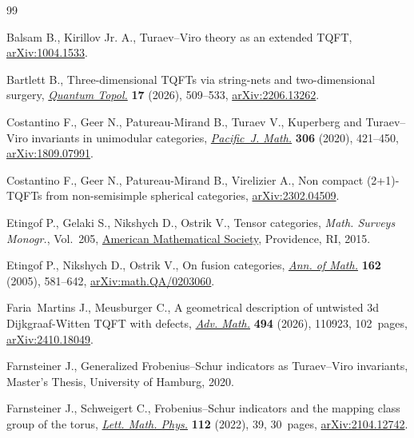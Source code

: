 \documentclass[10pt,a4paper]{amsart}
\numberwithin{equation}{section}
\theoremstyle{definition}
\begin{document}
\begin{thebibliography}{99}
\footnotesize\itemsep=0pt

Balsam B., Kirillov Jr. A., Turaev--{V}iro theory as an extended {TQFT},
 \href{http://arxiv.org/abs/1004.1533}{arXiv:1004.1533}.

Bartlett B., Three-dimensional {TQFT}s via string-nets and two-dimensional
 surgery, \href{https://doi.org/10.4171/qt/260}{\textit{Quantum Topol.}}
 \textbf{17} (2026), 509--533,
 \href{http://arxiv.org/abs/2206.13262}{arXiv:2206.13262}.

Costantino F., Geer N., Patureau-Mirand B., Turaev V., Kuperberg and
 {T}uraev--{V}iro invariants in unimodular categories,
 \href{https://doi.org/10.2140/pjm.2020.306.421}{\textit{Pacific~J. Math.}}
 \textbf{306} (2020), 421--450,
 \href{http://arxiv.org/abs/1809.07991}{arXiv:1809.07991}.

Costantino F., Geer N., Patureau-Mirand B., Virelizier A., Non compact
 (2+1)-{TQFT}s from non-semisimple spherical categories,
 \href{http://arxiv.org/abs/2302.04509}{arXiv:2302.04509}.

Etingof P., Gelaki S., Nikshych D., Ostrik V., Tensor categories, \textit{Math.
 Surveys Monogr.}, Vol.~205, \href{https://doi.org/10.1090/surv/205}{American
 Mathematical Society}, Providence, RI, 2015.

Etingof P., Nikshych D., Ostrik V., On fusion categories,
 \href{https://doi.org/10.4007/annals.2005.162.581}{\textit{Ann. of Math.}}
 \textbf{162} (2005), 581--642,
 \href{http://arxiv.org/abs/math.QA/0203060}{arXiv:math.QA/0203060}.

Faria~Martins J., Meusburger C., A geometrical description of untwisted 3d
 {D}ijkgraaf-{W}itten {TQFT} with defects,
 \href{https://doi.org/10.1016/j.aim.2026.110923}{\textit{Adv. Math.}}
 \textbf{494} (2026), 110923, 102~pages,
 \href{http://arxiv.org/abs/2410.18049}{arXiv:2410.18049}.

Farnsteiner J., Generalized {F}robenius--{S}chur indicators as {T}uraev--{V}iro
 invariants, {M}aster's {T}hesis, University of Hamburg, 2020.

Farnsteiner J., Schweigert C., Frobenius--{S}chur indicators and the mapping
 class group of the torus,
 \href{https://doi.org/10.1007/s11005-022-01513-6}{\textit{Lett. Math. Phys.}}
 \textbf{112} (2022), 39, 30~pages,
 \href{http://arxiv.org/abs/2104.12742}{arXiv:2104.12742}.


\end{thebibliography}
\end{document}
